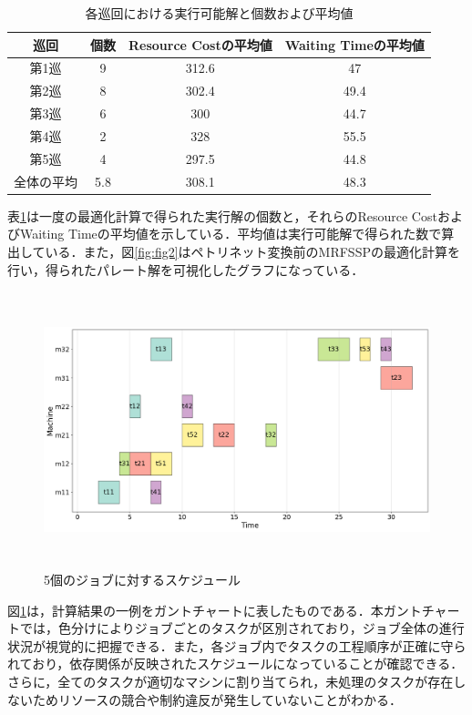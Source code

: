 \begin{table}[ht]
    \centering
    \vspace{-0.3cm}
    \caption{各巡回における実行可能解と個数および平均値}
    \begin{tabular}{|c|c|c|c|}
        \hline
         巡回 & 個数 & Resource Costの平均値 & Waiting Timeの平均値 \\
        \hline
        第1巡 & 9 & 312.6 & 47 \\
        \hline
        第2巡 & 8 & 302.4 & 49.4 \\
        \hline
        第3巡 & 6 & 300 & 44.7\\
        \hline
        第4巡 & 2 & 328 & 55.5 \\
        \hline
        第5巡 & 4 & 297.5 & 44.8 \\
        \hline
        全体の平均 & 5.8 & 308.1 & 48.3 \\
        \hline
    \end{tabular}
    \label{tab:before_feasible}
\end{table}

表\ref{tab:before_feasible}は一度の最適化計算で得られた実行解の個数と，それらのResource CostおよびWaiting Timeの平均値を示している．平均値は実行可能解で得られた数で算出している．また，図\ref{fig:fig2}はペトリネット変換前のMRFSSPの最適化計算を行い，得られたパレート解を可視化したグラフになっている．

\begin{figure}[H]
    \centering
    \includegraphics[width=0.8\linewidth, height=8cm]{./images/gantt1.png}
    \caption{5個のジョブに対するスケジュール}
    \label{fig:fig3}
\end{figure}

図\ref{fig:fig3}は，計算結果の一例をガントチャートに表したものである．本ガントチャートでは，色分けによりジョブごとのタスクが区別されており，ジョブ全体の進行状況が視覚的に把握できる．また，各ジョブ内でタスクの工程順序が正確に守られており，依存関係が反映されたスケジュールになっていることが確認できる．さらに，全てのタスクが適切なマシンに割り当てられ，未処理のタスクが存在しないためリソースの競合や制約違反が発生していないことがわかる．

